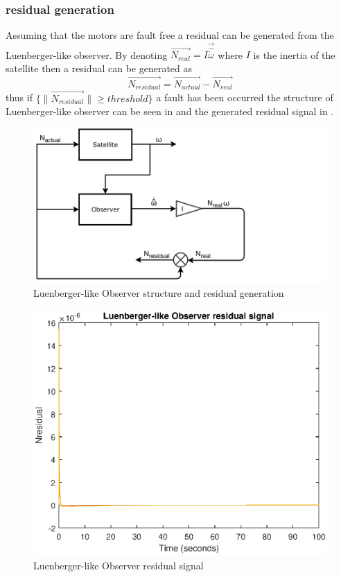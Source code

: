 \subsubsection{residual generation}
 \label{sec:simpleObserveresidual}
 Assuming that the motors are fault free a residual can be generated from the Luenberger-like observer. By denoting $\vec{N_{real}} =I\vec{\hat{{\dot \omega}}}$ where $I$ is the inertia of the satellite then a residual can be generated as
 \begin{equation}
 \vec{N_{residual}} = \vec{N_{actual}} - \vec{N_{real}}
 \label{eq:residualObs}
 \end{equation}
 thus if $\{\lVert \vec{N_{residual}}\rVert \geq threshold \}$ a fault has been occurred the structure of Luenberger-like observer can be seen in  and the generated residual signal in  . 
 \begin{figure}[H]
 	\vspace*{1cm}
 	\hspace*{3cm}\includegraphics[width=0.9\linewidth]{figures/Observer}\hspace*{-3cm}
 	\caption{Luenberger-like Observer structure and residual generation   }
 	\label{fig:observer}
 \end{figure}
%
\begin{figure}[H]
	\centering
	\includegraphics[width=0.9\linewidth]{figures/Observer_residual}
	\caption{Luenberger-like Observer residual signal }
	\label{fig:observerresidual}
\end{figure}

